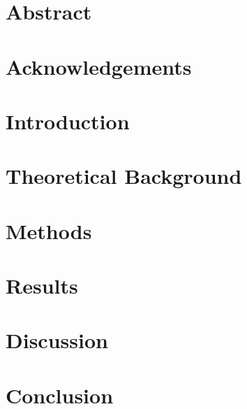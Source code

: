 \documentclass[11pt,a4paper]{article}
\begin{document}
\thispagestyle{empty}

\pagebreak
{}

\section*{Abstract}


\newpage
\section*{Acknowledgements}


\newpage
\tableofcontents

\newpage
\listoffigures

\listoftables

\newpage
{}

\section{Introduction}


\newpage
\section{Theoretical Background}


\newpage
\section{Methods}


\newpage
\section{Results}


\newpage
\section{Discussion}


\newpage
\section{Conclusion}


\newpage
\printbibliography[title = Literature, heading = bibintoc]
\end{document}
